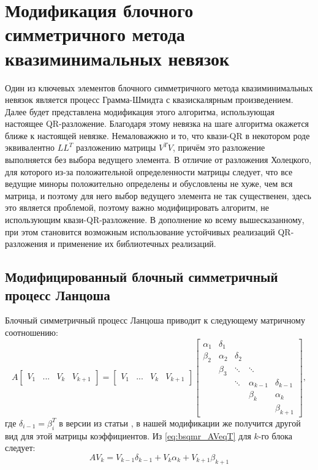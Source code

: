 \section{Модификация блочного симметричного метода квазиминимальных невязок}
\label{sec:bsqmr_mod} 

\par Один из ключевых элементов блочного симметричного метода квазиминимальных невязок \cite{doi:10.1137/0917019}
является процесс Грамма-Шмидта с квазискалярным произведением. Далее будет представлена модификация 
этого алгоритма, использующая настоящее QR-разложение. Благодаря этому невязка на 
шаге алгоритма окажется ближе к настоящей невязке. Немаловажжно и то, что квази-QR 
в некотором роде эквивалентно $LL^T$ разложению матрицы $V^T V$, причём это разложение
выполняется без выбора ведущего элемента. В отличие от разложения Холецкого, для которого из-за
положительной определенности матрицы следует, что все ведущие миноры положительно определены и 
обусловлены не хуже, чем вся матрица, и поэтому для него выбор ведущего элемента не так существенен,
здесь это является проблемой, поэтому важно модифицировать алгоритм, не использующим квази-QR-разложение. 
В дополнение ко всему вышесказанному, при этом становится возможным использование 
устойчивых реализаций QR-разложения и применение их библиотечных реализаций.
\subsection{Модифицированный блочный симметричный процесс Ланцоша}
\par Блочный симметричный процесс Ланцоша приводит к следующему матричному соотношению:
\begin{equation}
    \label{eq:bsqmr_AVeqT}
    A \begin{bmatrix}
        V_1 & ... & V_k & V_{k+1} 
    \end{bmatrix} = \begin{bmatrix}
        V_1 & ... & V_k & V_{k+1} 
    \end{bmatrix} \begin{bmatrix}
        \alpha_1 & \delta_1 & & & \\
        \beta_2 & \alpha_2 & \delta_2 & & \\
        & \beta_3 & \ddots & \ddots & \\
        & & \ddots & \alpha_{k-1} & \delta_{k-1} \\
        & & & \beta_k & \alpha_k \\
        & & & & \beta_{k+1}
    \end{bmatrix},
\end{equation} 
где $\delta_{i-1} = \beta_i^T$ в версии из статьи \cite{doi:10.1137/0917019}, в нашей
модификации же получится другой вид для этой матрицы коэффициентов. Из \eqref{eq:bsqmr_AVeqT} для $k$-го блока следует: 
\begin{equation}
    \label{eq:bsqmr_last_block}
    AV_k = V_{k-1}\delta_{k-1} + V_k \alpha_k + V_{k+1} \beta_{k+1}
\end{equation}

